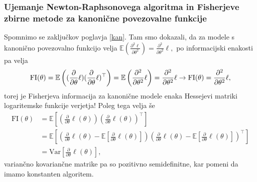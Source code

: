 \documentclass[12pt,a4paper]{amsart}
\theoremstyle{definition} %
\theoremstyle{plain} %
\begin{document}

\subsubsection{Ujemanje Newton-Raphsonovega algoritma in Fisherjeve zbirne metode za kanonične povezovalne funkcije}
Spomnimo se zaključkov poglavja \ref{kan}. Tam smo dokazali, da za modele s kanonično povezovalno funkcijo velja $\mathbb{E}(\frac{\partial^2\ell}{\partial\theta^2}) = \frac{\partial^2}{\partial\theta^2}\ell,$
po informacijski enakosti pa velja 
\begin{equation*}
    \mathrm{FI}(\theta) = \mathbb{E}\left((\frac{\partial}{\partial\theta} \ell)(\frac{\partial}{\partial\theta} \ell)^\top\right) = \mathbb{E}\left(\frac{\partial^2}{\partial\theta^2}\ell\right) = \frac{\partial^2}{\partial\theta^2}\ell \\
    \rightarrow \mathrm{FI}(\theta) = \frac{\partial^2}{\partial\theta^2}\ell,
\end{equation*}
torej je Fisherjeva informacija za kanonične modele enaka Hessejevi matriki logaritemske funkcije verjetja! Poleg tega velja še
\begin{align}
    \mathrm{FI}(\theta) &= \mathbb{E}[(\frac{\partial}{\partial\theta} \ell(\theta))(\frac{\partial}{\partial\theta} \ell(\theta))^\top] \nonumber\\
    &= \mathbb{E}[\left(\frac{\partial}{\partial\theta} \ell(\theta) - \mathbb{E}[\frac{\partial}{\partial\theta} \ell(\theta)]\right)\left(\frac{\partial}{\partial\theta} \ell(\theta) - \mathbb{E}[\frac{\partial}{\partial\theta} \ell(\theta)]\right)^\top] \nonumber \\
    &= \mathrm{Var}[\frac{\partial}{\partial\theta} \ell(\theta)],
\end{align}
variančno kovariančne matrike pa so pozitivno semidefinitne, kar pomeni da imamo konstanten algoritem.
\end{document}
